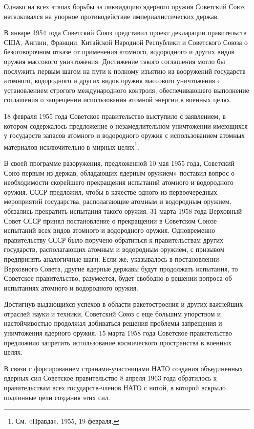 \documentclass[12pt, a4paper, openany]{book}
\begin{document}
	Однако на всех этапах борьбы за ликвидацию ядерного оружия Советский Союз наталкивался на упорное противодействие империалистических держав.
	
	В январе 1954 года Советский Союз представил проект декларации правительств США, Англии, Франции, Китайской Народной Республики и Советского Союза о безоговорочном отказе от применения атомного, водородного и других видов оружия массового уничтожения. Достижение такого соглашения могло бы послужить первым шагом на пути к полному изъятию из вооружений государств атомного, водородного и других видов оружия массового уничтожения с установлением строгого международного контроля, обеспечивающего выполнение соглашения о запрещении использования атомной энергии в военных целях.
	
	18 февраля 1955 года Советское правительство выступило с заявлением, в котором содержалось предложение о незамедлительном уничтожении имеющихся у государств запасов атомного и водородного оружия с использованием атомных материалов исключительно в мирных целях{\footnote{См. «Правда», 1955, 19 февраля.}}.
	
	
	В своей программе разоружения, предложенной 10 мая 1955 года, Советский Союз первым из держав, обладающих ядерным оружием» поставил вопрос о необходимости скорейшего прекращения испытаний атомного и водородного оружия. СССР предложил, чтобы в качестве одного из первоочередных мероприятий государства, располагающие атомным и водородным оружием, обязались прекратить испытания такого оружия. 31 марта 1958 года Верховный Совет СССР принял постановление о прекращении в Советском Союзе испытаний всех видов атомного и водородного оружия. Одновременно правительству СССР было поручено обратиться к правительствам других государств, располагающих атомным и водородным оружием, с призывом предпринять аналогичные шаги. Если же, указывалось в постановлении Верховного Совета, другие ядерные державы будут продолжать испытания, то Советское правительство, разумеется, будет свободно в решении вопроса об испытаниях атомного и водородного оружия.
	
	Достигнув выдающихся успехов в области ракетостроения и других важнейших отраслей науки и техники, Советский Союз с еще большим упорством и настойчивостью продолжал добиваться решения проблемы запрещения и уничтожения ядерного оружия. 15 марта 1958 года Советское правительство предложило запретить использование космического пространства в военных целях.
	
	В связи с форсированием странами-участницами НАТО создания объединенных ядерных сил Советское правительство 8 апреля 1963 года обратилось к правительствам всех государств-членов НАТО с нотой, в которой вскрыло подлинные цели создания этих сил.
	
\end{document}
